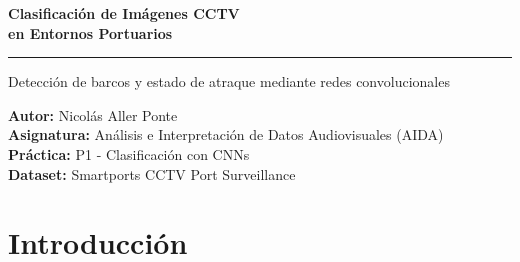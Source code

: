 \documentclass[11pt, a4paper]{article}
\begin{document}
\begin{titlepage}
    \centering
    \vspace*{2cm}
    {\Large\bfseries Clasificación de Imágenes CCTV\\[0.4em]
    en Entornos Portuarios\par}
    \vspace{0.5cm}
    \rule{10cm}{0.5pt}
    \vspace{0.5cm}

    {\large Detección de barcos y estado de atraque mediante redes convolucionales\par}
    \vspace{2cm}

    {\normalsize
    \textbf{Autor:} Nicolás Aller Ponte\\[0.3em]
    \textbf{Asignatura:} Análisis e Interpretación de Datos Audiovisuales (AIDA)\\[0.3em]
    \textbf{Práctica:} P1 - Clasificación con CNNs\\[0.3em]
    \textbf{Dataset:} Smartports CCTV Port Surveillance\\[0.3em]
    }
    \vspace{1.5cm}

    \begin{abstract}
    \noindent
    Este trabajo aborda dos tareas de clasificación binaria sobre imágenes de
    cámaras CCTV de un puerto: (1)~detección de barco (\textit{Ship/No-Ship}) y
    (2)~estado de atraque (\textit{Docked/Undocked}). Se comparan tres
    arquitecturas - una CNN ligera entrenada desde cero (\textsc{SimpleCNN}),
    una variante inspirada en ConvNeXt (\textsc{MiniConvNeXt}) y
    \textsc{ResNet18} con \textit{fine-tuning} desde ImageNet - bajo un esquema
    de validación cruzada de 5 iteraciones. Adicionalmente se
    evalúa una estrategia de \textit{transfer learning} inter-tarea
    (Ship $\to$ Docked). \textsc{ResNet18} domina en ambas tareas, alcanzando
    AUC-ROC de 0.999 en Ship y 0.861 en Docked. El transfer learning
    inter-tarea no parece mejorar los resultados.
    \end{abstract}
\end{titlepage}

\section{Introducción}
\end{document}
